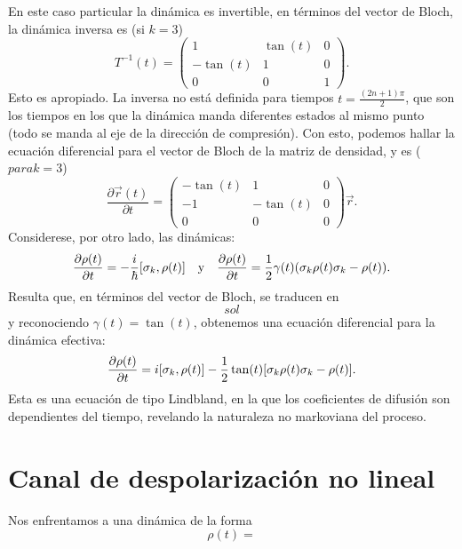 En este caso particular la dinámica es invertible, en términos del vector de Bloch, la dinámica inversa es (si $k=3$)
\begin{equation*}
    T^{-1}(t)=\begin{pmatrix}
        1 & \tan(t) & 0 \\
        -\tan(t) & 1 & 0 \\
        0 & 0 & 1
     \end{pmatrix}.
\end{equation*}
Esto es apropiado. La inversa no está definida para tiempos $t=\frac{(2n+1)\pi}{2}$, que son los tiempos en los que la dinámica manda diferentes estados al mismo punto (todo se manda al eje de la dirección de compresión). Con esto, podemos hallar la ecuación diferencial para el vector de Bloch de la matriz de densidad, y es ($para k=3$)
\begin{equation*}
    \frac{\partial \vec{r}(t)}{\partial t}= \begin{pmatrix}
        -\tan(t) & 1 & 0 \\
        -1 & -\tan(t) & 0 \\
        0 & 0 & 0
     \end{pmatrix}\vec{r}.
\end{equation*}
Considerese, por otro lado, las dinámicas:
\begin{align*}
    \frac{\partial \rho(t)}{\partial t}=-\frac{i}{\hbar}[\sigma_{k},\rho(t)]& & \text{y} & & \frac{\partial \rho(t)}{\partial t}=\frac{1}{2}\gamma(t)\qty(\sigma_{k}\rho(t)\sigma_{k}-\rho(t)).
\end{align*}
Resulta que, en términos del vector de Bloch, se traducen en 
\begin{equation*}
    sol
\end{equation*}
y reconociendo $\gamma(t)=\tan(t)$, obtenemos una ecuación diferencial para la dinámica efectiva:
\begin{equation*}
    \frac{\partial \rho(t)}{\partial t}=i[\sigma_{k},\rho(t)]-\frac{1}{2}\tan(t)\qty[\sigma_{k}\rho(t)\sigma_{k}-\rho(t)].
\end{equation*}
Esta es una ecuación de tipo Lindbland, en la que los coeficientes de difusión son dependientes del tiempo, revelando la naturaleza no markoviana del proceso.
\section{Canal de despolarización no lineal}
Nos enfrentamos a una dinámica de la forma 
\begin{equation*}
    \rho(t)=
\end{equation*}